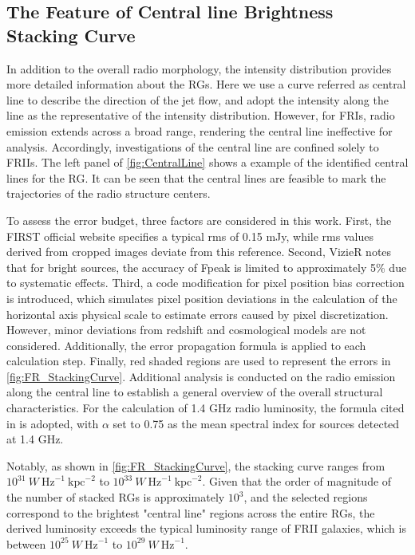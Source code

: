 \documentclass{aa}
\begin{document}
\subsection{The Feature of Central line Brightness Stacking Curve}\label{sec:Section4_5}

In addition to the overall radio morphology, the intensity distribution provides more detailed information about the RGs. 
Here we use a curve referred as central line to describe the direction of the jet flow, and adopt the intensity along the line as the representative of the intensity distribution.
However, for FRIs, radio emission extends across a broad range, rendering the central line ineffective for analysis. Accordingly, investigations of the central line are confined solely to FRIIs.
The left panel of \autoref{fig:CentralLine} shows a example of the identified central lines for the RG. It can be seen that the central lines are feasible to mark the trajectories of the radio structure centers.


To assess the error budget, three factors are considered in this work. First, the FIRST official website specifies a typical rms of 0.15 mJy, while rms values derived from cropped images deviate from this reference. Second, VizieR notes that for bright sources, the accuracy of Fpeak is limited to approximately 5\% due to systematic effects. Third, a code modification for pixel position bias correction is introduced, which simulates pixel position deviations in the calculation of the horizontal axis physical scale to estimate errors caused by pixel discretization. However, minor deviations from redshift and cosmological models are not considered. Additionally, the error propagation formula is applied to each calculation step. Finally, red shaded regions are used to represent the errors in \autoref{fig:FR_StackingCurve}.
Additional analysis is conducted on the radio emission along the central line to establish a general overview of the overall structural characteristics. For the calculation of 1.4 GHz radio luminosity, the formula cited in \cite{koziel-wierzbowska_2021} is adopted, with $\alpha$ set to 0.75 as the mean spectral index for sources detected at 1.4 GHz.

Notably, as shown in \autoref{fig:FR_StackingCurve}, the stacking curve ranges from $ 10^{31}\ W\ \text{Hz}^{-1}\ \text{kpc}^{-2} $ to $ 10^{33}\ W\ \text{Hz}^{-1}\ \text{kpc}^{-2} $. Given that the order of magnitude of the number of stacked RGs is approximately $ 10^{3} $, and the selected regions correspond to the brightest "central line" regions across the entire RGs, the derived luminosity exceeds the typical luminosity range of FRII galaxies, which is between $ 10^{25}\ W\ \text{Hz}^{-1}  $ to $ 10^{29}\ W\ \text{Hz}^{-1} $\citep[e.g.,][]{an_dynamic_2012}.
\end{document}
